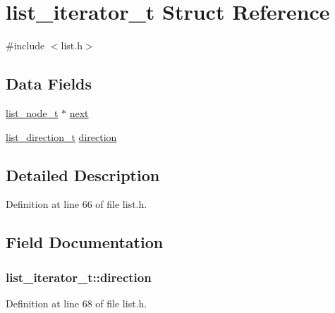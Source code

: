 \hypertarget{structlist__iterator__t}{}\section{list\+\_\+iterator\+\_\+t Struct Reference}
\label{structlist__iterator__t}


{\ttfamily \#include $<$list.\+h$>$}

\subsection*{Data Fields}
\begin{DoxyCompactItemize}
\item 
\hyperlink{list_8h_ad8b8636e2e25308b521b32071e849c80}{list\+\_\+node\+\_\+t} $\ast$ \hyperlink{structlist__iterator__t_adfc911fa0f601936c4a58c95a08737ee}{next}
\item 
\hyperlink{list_8h_a2c3af7de0b7ab9c3a84fbc039e75ec66}{list\+\_\+direction\+\_\+t} \hyperlink{structlist__iterator__t_aa95ac6753d9a9e3671e4c21f3d05b32a}{direction}
\end{DoxyCompactItemize}


\subsection{Detailed Description}


Definition at line 66 of file list.\+h.



\subsection{Field Documentation}
\subsubsection[{\texorpdfstring{direction}{direction}}]{ list\+\_\+iterator\+\_\+t\+::direction}\hypertarget{structlist__iterator__t_aa95ac6753d9a9e3671e4c21f3d05b32a}{}\label{structlist__iterator__t_aa95ac6753d9a9e3671e4c21f3d05b32a}


Definition at line 68 of file list.\+h.

